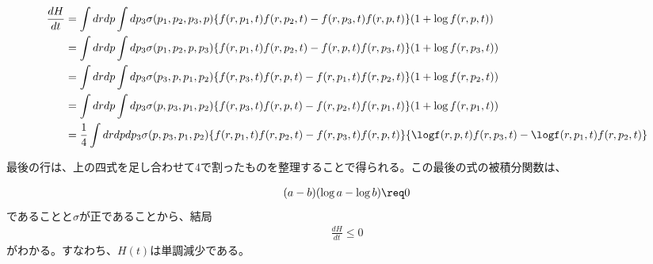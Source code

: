 \documentclass[uplatex,dvipdfmx]{jsarticle}
\begin{document}
\begin{align}
    \frac{dH}{dt} &= \int drdp \int dp_3 \sigma(p_1,p_2,p_3,p) \{f(r,p_1,t)f(r,p_2,t)-f(r, p_3, t)f(r, p,t)\}(1+\log f(r,p,t)) \\ 
        &= \int drdp \int dp_3 \sigma(p_1,p_2,p,p_3) \{f(r,p_1,t)f(r,p_2,t)-f(r, p, t)f(r, p_3,t)\}(1+\log f(r,p_3,t)) \\
        &= \int drdp \int dp_3 \sigma(p_3,p,p_1,p_2) \{f(r,p_3,t)f(r,p,t)-f(r, p_1, t)f(r, p_2,t)\}(1+\log f(r,p_2,t)) \\
        &= \int drdp \int dp_3 \sigma(p,p_3,p_1,p_2) \{f(r,p_3,t)f(r,p,t)-f(r, p_2, t)f(r, p_1,t)\}(1+\log f(r,p_1,t)) \\
        &= \frac{1}{4} \int drdpdp_3 \sigma(p,p_3,p_1,p_2)
            \{ f(r,p_1,t)f(r,p_2,t) - f(r,p_3,t)f(r,p,t) \}
            \{\logf(r,p,t)f(r,p_3,t)- \logf(r,p_1,t)f(r,p_2,t)\}
\end{align}

最後の行は、上の四式を足し合わせて4で割ったものを整理することで得られる。この最後の式の被積分関数は、

\begin{align*}
    (a-b)(\log a-\log b) &\req 0 \\
\end{align*}
であることと$\sigma$が正であることから、結局
\begin{align}
    \frac{dH}{dt} \leq 0    
\end{align}
がわかる。すなわち、$H(t)$は単調減少である。
\end{document}
